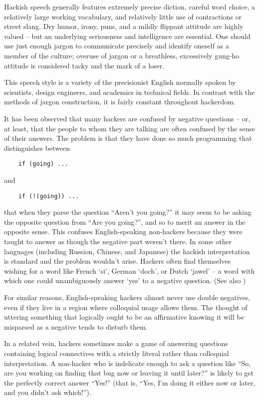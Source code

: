 Hackish speech generally features extremely precise diction, careful word choice, a relatively large working vocabulary, and relatively
little use of contractions or street slang. Dry humor, irony, puns, and a mildly flippant attitude are highly valued -- but an underlying
seriousness and intelligence are essential. One should use just enough jargon to communicate precisely and identify oneself as a member of
the culture; overuse of jargon or a breathless, excessively gung-ho attitude is considered tacky and the mark of a loser.

This speech style is a variety of the precisionist English normally spoken by scientists, design engineers, and academics in technical
fields. In contrast with the methods of jargon construction, it is fairly constant throughout hackerdom.

It has been observed that many hackers are confused by negative questions -- or, at least, that the people to whom they are talking are
often confused by the sense of their answers. The problem is that they have done so much programming that distinguishes between

\begin{verbatim}
	if (going) ...
\end{verbatim}

and

\begin{verbatim}
	if (!(going)) ...
\end{verbatim}

that when they parse the question ``Aren't you going?'' it may seem to be asking the opposite question from ``Are you going?'', and so to
merit an answer in the opposite sense. This confuses English-speaking non-hackers because they were taught to answer as though the negative
part weren't there. In some other languages (including Russion, Chinese, and Japanese) the hackish interpretation is standard and the
problem wouldn't arise. Hackers often find themselves wishing for a word like French `si', German `doch', or Dutch `jawel' -- a word with
which one could unambiguously answer `yes' to a negative question. (See also )

For similar reasons, English-speaking hackers almost never use double negatives, even if they live in a region where colloquial usage
allows them. The thought of uttering something that logically ought to be an affirmative knowing it will be misparsed as a negative tends
to disturb them.

In a related vein, hackers sometimes make a game of answering questions containing logical connectives with a strictly literal rather than
colloquial interpretation. A non-hacker who is indelicate enough to ask a question like ``So, are you working on finding that bug now or
leaving it until later?'' is likely to get the perfectly correct answer ``Yes!'' (that is, ``Yes, I'm doing it either now or later, and
you didn't ask which!'').

